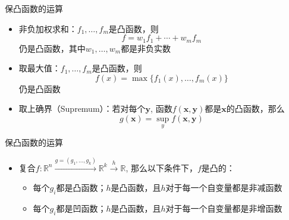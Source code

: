 \begin{frame}

\begin{block}{保凸函数的运算}
\begin{itemize}
\item 非负加权求和：$f_1,\ldots,f_m$是凸函数，则
\[f = w_1f_1+\cdots+w_mf_m\]
仍是凸函数，其中$w_1,\ldots,w_m$都是非负实数
\item 取最大值：$f_1,\ldots,f_m$是凸函数，则
\[f(x) = \max\{f_1(x),\ldots,f_m(x)\}\]
仍是凸函数
\item 取上确界（Supremum）：若对每个$\mathbf{y}$, 函数$f(\mathbf{x}, \mathbf{y})$都是$\mathbf{x}$的凸函数，那么
\[g(\mathbf{x}) = \sup\limits_{y} f(\mathbf{x}, \mathbf{y})\]
\end{itemize}
\end{block}

\end{frame}


\begin{frame}

\begin{block}{保凸函数的运算}
\begin{itemize}
\item 复合$f: \mathbb{R}^n \xrightarrow{g = (g_1,\ldots,g_k)} \mathbb{R}^k \xrightarrow{h} \mathbb{R}$, 那么以下条件下，$f$是凸的：
\begin{itemize}
\item[$\bullet$] 每个$g_i$都是凸函数；$h$是凸函数，且$h$对于每一个自变量都是非减函数
\item[$\bullet$] 每个$g_i$都是凹函数；$h$是凸函数，且$h$对于每一个自变量都是非增函数
\end{itemize}

\end{itemize}
\end{block}

\end{frame}


